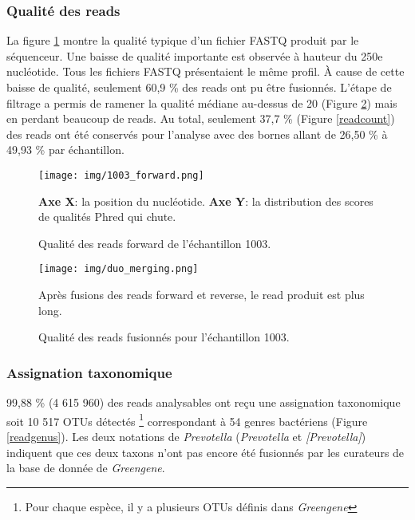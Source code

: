 \documentclass[12pt,a4paper]{article}
\begin{document}
\subsubsection{Qualité des reads}
La figure \ref{fastqt} montre la qualité typique d'un fichier FASTQ produit par le séquenceur. Une baisse de qualité importante est observée à hauteur du 250e nucléotide. Tous les fichiers FASTQ présentaient le même profil.
À cause de cette baisse de qualité, seulement 60,9 \% des reads ont pu être fusionnés.
L'étape de filtrage a permis de ramener la qualité médiane au-dessus de 20 (Figure \ref{fastqt_after}) mais en perdant beaucoup de reads.
Au total, seulement 37,7 \% (Figure \ref{readcount}) des reads ont été conservés pour l'analyse avec des bornes allant de 26,50 \% à 49,93 \% par échantillon.


\begin{figure}[H]
\begin{center}
\texttt{[image: img/1003\_forward.png]}\hfill
\caption{Qualité des reads forward de l'échantillon 1003.} \textbf{Axe X}: la position du nucléotide. \textbf{Axe Y}: la distribution des scores de qualités Phred qui chute.
\label{fastqt}
\end{center}
\end{figure}


\begin{figure}[H]
\begin{center}
\texttt{[image: img/duo\_merging.png]}\hfill

\caption{Qualité des reads fusionnés pour l'échantillon 1003.}
Après fusions des reads forward et reverse, le read produit est plus long.
\label{fastqt_after}

\end{center}
\end{figure}


\subsubsection{Assignation taxonomique}
99,88 \% (4 615 960) des reads analysables ont reçu une assignation taxonomique soit 10 517 OTUs détectés \footnote{Pour chaque espèce, il y a plusieurs OTUs définis dans \textit{Greengene}} correspondant à 54 genres bactériens (Figure \ref{readgenus}). Les deux notations de \textit{Prevotella} (\textit{Prevotella} et \textit{[Prevotella]}) indiquent que ces deux taxons n'ont pas encore été fusionnés par les curateurs de la base de donnée de \textit{Greengene}.
\end{document}
